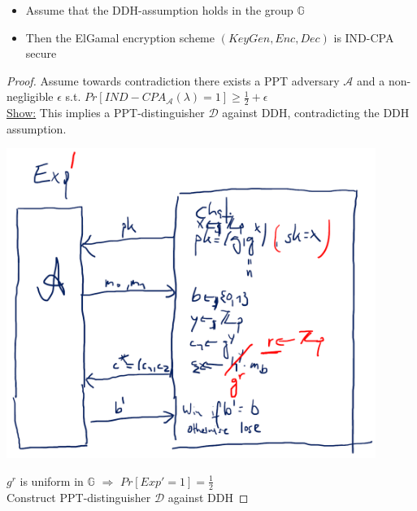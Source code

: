 \begin{theorem}
	\begin{itemize}\label{thm8.2}\ 
		\item Assume that the DDH-assumption holds in the group $\mathbb{G}$
		\item Then the ElGamal encryption scheme $(KeyGen,Enc,Dec)$ is IND-CPA secure
	\end{itemize}
\end{theorem}
\begin{proof}
	Assume towards contradiction there exists a PPT adversary $\mathcal{A}$ and a non-negligible $\epsilon$ s.t. $Pr[IND-CPA_{\mathcal{A}}(\lambda)=1] \geq \frac{1}{2} + \epsilon$\\
	\underline{Show:} This implies a PPT-distinguisher $\mathcal{D}$ against DDH, contradicting the DDH assumption.
\begin{center}
	\includegraphics[width=120mm]{Graphics/Public Key Encryption/pke3.png}
\end{center}

$g^r$ is uniform in $\mathbb{G}$ $\Rightarrow$ $Pr[Exp'=1] = \frac{1}{2}$\\

Construct PPT-distinguisher $\mathcal{D}$ against DDH


\end{proof}
